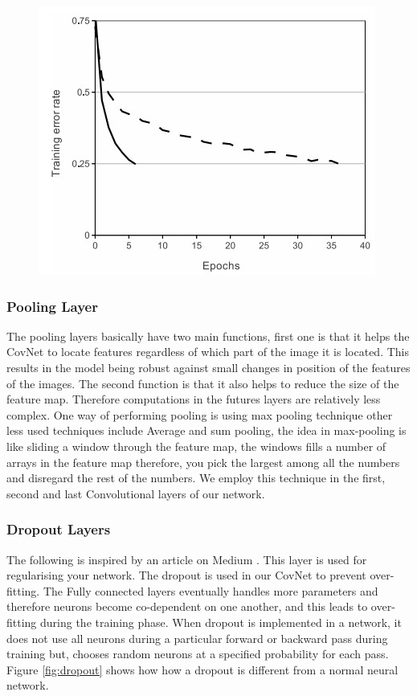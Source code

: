 \documentclass[12pt, a4paper,oneside]{report}
\begin{document}
\begin{figure}
	\includegraphics [scale=0.9] {relu}
	\label{fig:relu}
\end{figure}


\subsubsection{Pooling Layer}
The pooling layers basically have two main functions, first one is that it helps the CovNet to locate features regardless of which part of the image it is located. This results in the model being robust against small changes in position of the features of the images. The second function is that it also helps to reduce the size of the feature map. Therefore computations in the futures layers are relatively less complex. One way of performing pooling is using max pooling technique other less used techniques include Average and sum pooling, the idea in max-pooling is like sliding a window through the feature map, the windows fills a number of arrays in the feature map therefore, you pick the largest among all the numbers and disregard the rest of the numbers. We employ this technique in the first, second and last Convolutional layers of our network.

\subsubsection{Dropout Layers}
The following is inspired by an article on Medium \cite{dropout}. 
This layer is used for regularising your network. The dropout is used in our CovNet to prevent over-fitting. The Fully connected layers eventually handles more parameters and therefore neurons become co-dependent on one another, and this leads to over-fitting during the training phase. When dropout is implemented in a network, it does not use all neurons during a particular forward or backward pass during training but, chooses random neurons at a specified probability for each pass. Figure \ref{fig:dropout} shows how how a dropout is different from a normal neural network.
\end{document}
